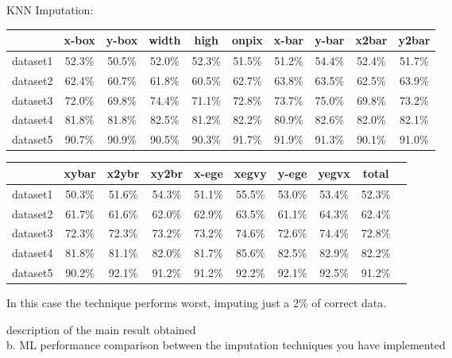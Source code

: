 \documentclass{article}
\begin{document}
KNN Imputation:
\begin{center}
    \begin{table}[h]
\begin{tabular}{|c|c|c|c|c|c|c|c|c|c|}
\hline
& x-box & y-box & width & high & onpix & x-bar & y-bar & x2bar & y2bar \\ \hline
dataset1 & 52.3\% & 50.5\% & 52.0\% & 52.3\% & 51.5\% & 51.2\% & 54.4\% & 52.4\% & 51.7\% \\ \hline
dataset2 & 62.4\% & 60.7\% & 61.8\% & 60.5\% & 62.7\% & 63.8\% & 63.5\% & 62.5\% & 63.9\% \\ \hline
dataset3 & 72.0\% & 69.8\% & 74.4\% & 71.1\% & 72.8\% & 73.7\% & 75.0\% & 69.8\% & 73.2\% \\ \hline
dataset4 & 81.8\% & 81.8\% & 82.5\% & 81.2\% & 82.2\% & 80.9\% & 82.6\% & 82.0\% & 82.1\% \\ \hline
dataset5 & 90.7\% & 90.9\% & 90.5\% & 90.3\% & 91.7\% & 91.9\% & 91.3\% & 90.1\% & 91.0\% \\ \hline
\end{tabular}

\begin{tabular}{|c|c|c|c|c|c|c|c|c|c|}
\hline
& xybar & x2ybr & xy2br & x-ege & xegvy & y-ege & yegvx & total \\ \hline
dataset1 & 50.3\% & 51.6\% & 54.3\% & 51.1\% & 55.5\% & 53.0\% & 53.4\% & 52.3\% \\ \hline
dataset2 & 61.7\% & 61.6\% & 62.0\% & 62.9\% & 63.5\% & 61.1\% & 64.3\% & 62.4\% \\ \hline
dataset3 & 72.3\% & 72.3\% & 73.2\% & 73.2\% & 74.6\% & 72.6\% & 74.4\% & 72.8\% \\ \hline
dataset4 & 81.8\% & 81.1\% & 82.0\% & 81.7\% & 85.6\% & 82.5\% & 82.9\% & 82.2\% \\ \hline
dataset5 & 90.2\% & 92.1\% & 91.2\% & 91.2\% & 92.2\% & 92.1\% & 92.5\% & 91.2\% \\ \hline
\end{tabular}
\end{table}
\end{center}
In this case the technique performs worst, imputing just a 2\% of correct data.





description of the main result obtained\\
b.	ML performance comparison between the imputation techniques you have implemented
\end{document}
